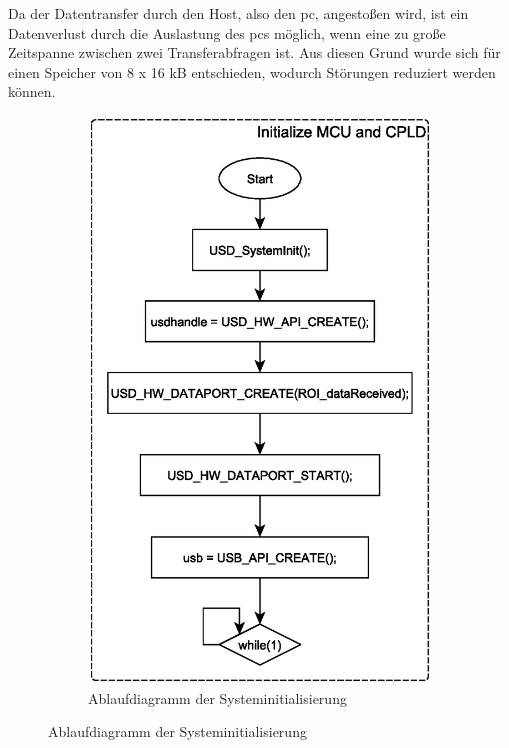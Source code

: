Da der Datentransfer durch den Host, also den \ac{pc}, angestoßen wird, ist ein Datenverlust durch die Auslastung des \ac{pc}s möglich, wenn eine zu große Zeitspanne zwischen zwei Transferabfragen ist. Aus diesen Grund wurde sich für einen Speicher von 8 x 16 kB entschieden, wodurch Störungen reduziert werden können.
\begin{figure}[h!]
        \centering
        \begin{subfigure}[t]{0.425\textwidth}
                \includegraphics[width=1\textwidth, trim=0mm 0mm 0mm 0mm, clip=true]{images/software/init.eps}%
	    		\caption{Ablaufdiagramm der Systeminitialisierung}

\end{subfigure}
\end{figure}
